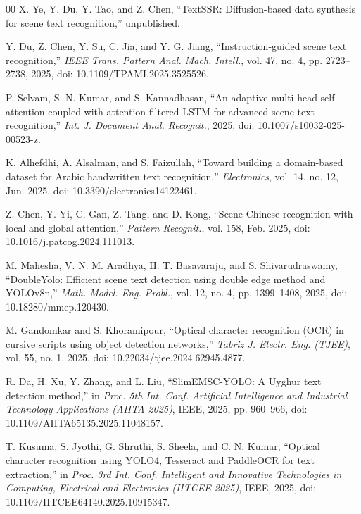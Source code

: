 \documentclass{ieeeaccess}
\begin{document}
{\begin{thebibliography}{00}
 X. Ye, Y. Du, Y. Tao, and Z. Chen, ``TextSSR: Diffusion-based
  data synthesis for scene text recognition,'' unpublished.

 Y. Du, Z. Chen, Y. Su, C. Jia, and Y. G. Jiang,
  ``Instruction-guided scene text recognition,''
  \textit{IEEE Trans. Pattern Anal. Mach. Intell.}, vol. 47, no. 4,
  pp. 2723--2738, 2025, doi: 10.1109/TPAMI.2025.3525526.

 P. Selvam, S. N. Kumar, and S. Kannadhasan, ``An adaptive
  multi-head self-attention coupled with attention filtered LSTM for advanced
  scene text recognition,'' \textit{Int. J. Document Anal. Recognit.}, 2025,
  doi: 10.1007/s10032-025-00523-z.

 K. Alhefdhi, A. Alsalman, and S. Faizullah, ``Toward building a
  domain-based dataset for Arabic handwritten text recognition,''
  \textit{Electronics}, vol. 14, no. 12, Jun. 2025,
  doi: 10.3390/electronics14122461.

 Z. Chen, Y. Yi, C. Gan, Z. Tang, and D. Kong, ``Scene Chinese
  recognition with local and global attention,'' \textit{Pattern Recognit.},
  vol. 158, Feb. 2025, doi: 10.1016/j.patcog.2024.111013.

 M. Mahesha, V. N. M. Aradhya, H. T. Basavaraju, and
  S. Shivarudraswamy, ``DoubleYolo: Efficient scene text detection using double
  edge method and YOLOv8n,'' \textit{Math. Model. Eng. Probl.}, vol. 12, no. 4,
  pp. 1399--1408, 2025, doi: 10.18280/mmep.120430.

 M. Gandomkar and S. Khoramipour, ``Optical character recognition
  (OCR) in cursive scripts using object detection networks,''
  \textit{Tabriz J. Electr. Eng. (TJEE)}, vol. 55, no. 1, 2025,
  doi: 10.22034/tjee.2024.62945.4877.

 R. Da, H. Xu, Y. Zhang, and L. Liu, ``SlimEMSC-YOLO: A Uyghur
  text detection method,'' in \textit{Proc. 5th Int. Conf. Artificial Intelligence
  and Industrial Technology Applications (AIITA 2025)}, IEEE, 2025,
  pp. 960--966, doi: 10.1109/AIITA65135.2025.11048157.

 T. Kusuma, S. Jyothi, G. Shruthi, S. Sheela, and C. N. Kumar,
  ``Optical character recognition using YOLO4, Tesseract and PaddleOCR for text
  extraction,'' in \textit{Proc. 3rd Int. Conf. Intelligent and Innovative
  Technologies in Computing, Electrical and Electronics (IITCEE 2025)}, IEEE,
  2025, doi: 10.1109/IITCEE64140.2025.10915347.


\end{thebibliography}}
\end{document}

